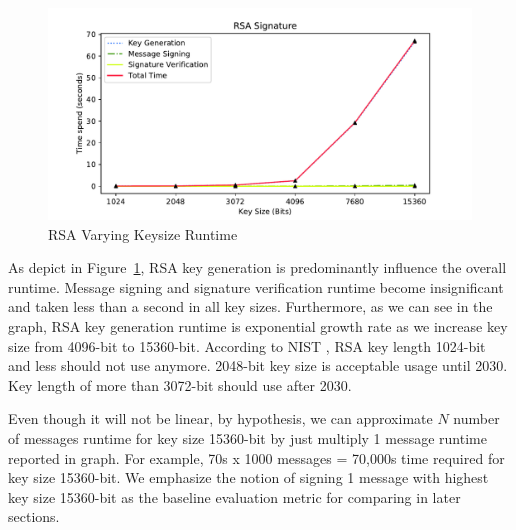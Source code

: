 \documentclass[10pt,sigconf]{acmart}
\begin{document}
\begin{figure}
\centering
\includegraphics[scale=0.45]{RSA_Varying_Keysize_Runtime_Graph}
\caption{\small{RSA Varying Keysize Runtime}}
\label{fig:RSA_Varying_Keysize_Runtime_Graph}
\end{figure}

As depict in Figure~\ref{fig:RSA_Varying_Keysize_Runtime_Graph}, RSA key generation is predominantly influence the overall runtime. Message signing and signature verification runtime become insignificant and taken less than a second in all key sizes. Furthermore, as we can see in the graph, RSA key generation runtime is exponential growth rate as we increase key size from 4096-bit to 15360-bit. According to NIST \cite{nistKeysizes}, RSA key length 1024-bit and less should not use anymore. 2048-bit key size is acceptable usage until 2030. Key length of more than 3072-bit should use after 2030.

Even though it will not be linear, by hypothesis, we can approximate $N$ number of messages runtime for key size 15360-bit by just multiply 1 message runtime reported in graph. For example, 70s x 1000 messages = 70,000s time required for key size 15360-bit. We emphasize the notion of signing 1 message with highest key size 15360-bit as the baseline evaluation metric for comparing in later sections.


\end{document}
